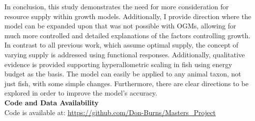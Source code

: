 \documentclass[a4paper, 11pt, hidelinks]{article} %
\begin{document}
	
	In conclusion, this study demonstrates the need for more consideration for resource supply within growth models.  Additionally, I provide direction where the model can be expanded upon that was not possible with OGMs, allowing for much more controlled and detailed explanations of the factors controlling growth.  In contrast to all previous work, which assume optimal supply, the concept of varying supply is addressed using functional responses.  Additionally, qualitative evidence is provided supporting hyperallometric scaling in fish using energy budget as the basis.  The model can easily be applied to any animal taxon, not just fish, with some simple changes.  Furthermore, there are clear directions to be explored in order to improve the model's accuracy.
	\\
	\textbf{Code and Data Availability}
	\\
	Code is available at: \url{https://github.com/Don-Burns/Masters_Project}
	
	
	
	\newpage
	
	
	\printbibliography
	
	
	
	\newpage
	
	
	
\end{document}
